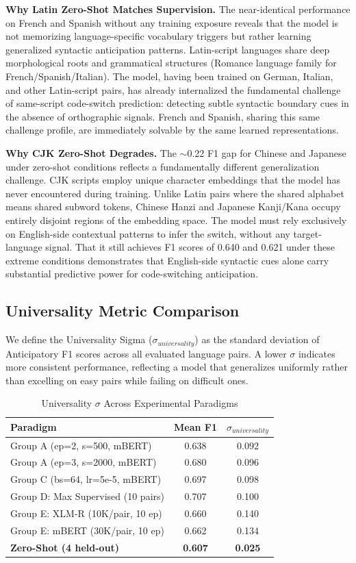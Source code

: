 \documentclass[sigconf,nonacm]{acmart}
\begin{document}
\textbf{Why Latin Zero-Shot Matches Supervision.} The near-identical performance on French and Spanish without any training exposure reveals that the model is not memorizing language-specific vocabulary triggers but rather learning generalized syntactic anticipation patterns. Latin-script languages share deep morphological roots and grammatical structures (Romance language family for French/Spanish/Italian). The model, having been trained on German, Italian, and other Latin-script pairs, has already internalized the fundamental challenge of same-script code-switch prediction: detecting subtle syntactic boundary cues in the absence of orthographic signals. French and Spanish, sharing this same challenge profile, are immediately solvable by the same learned representations.

\textbf{Why CJK Zero-Shot Degrades.} The $\sim$0.22 F1 gap for Chinese and Japanese under zero-shot conditions reflects a fundamentally different generalization challenge. CJK scripts employ unique character embeddings that the model has never encountered during training. Unlike Latin pairs where the shared alphabet means shared subword tokens, Chinese Hanzi and Japanese Kanji/Kana occupy entirely disjoint regions of the embedding space. The model must rely exclusively on English-side contextual patterns to infer the switch, without any target-language signal. That it still achieves F1 scores of 0.640 and 0.621 under these extreme conditions demonstrates that English-side syntactic cues alone carry substantial predictive power for code-switching anticipation.

\subsection{Universality Metric Comparison}
We define the Universality Sigma ($\sigma_{universality}$) as the standard deviation of Anticipatory F1 scores across all evaluated language pairs. A lower $\sigma$ indicates more consistent performance, reflecting a model that generalizes uniformly rather than excelling on easy pairs while failing on difficult ones.

\begin{table}[h]
\centering
\caption{Universality $\sigma$ Across Experimental Paradigms}
\label{tab:sigma}
\begin{tabular}{lcc}
\toprule
\textbf{Paradigm} & \textbf{Mean F1} & \textbf{$\sigma_{universality}$} \\
\midrule
Group A (ep=2, s=500, mBERT) & 0.638 & 0.092 \\
Group A (ep=3, s=2000, mBERT) & 0.680 & 0.096 \\
Group C (bs=64, lr=5e-5, mBERT) & 0.697 & 0.098 \\
Group D: Max Supervised (10 pairs) & 0.707 & 0.100 \\
Group E: XLM-R (10K/pair, 10 ep) & 0.660 & 0.140 \\
Group E: mBERT (30K/pair, 10 ep) & 0.662 & 0.134 \\
\textbf{Zero-Shot (4 held-out)} & \textbf{0.607} & \textbf{0.025} \\
\bottomrule
\end{tabular}
\end{table}
\end{document}
